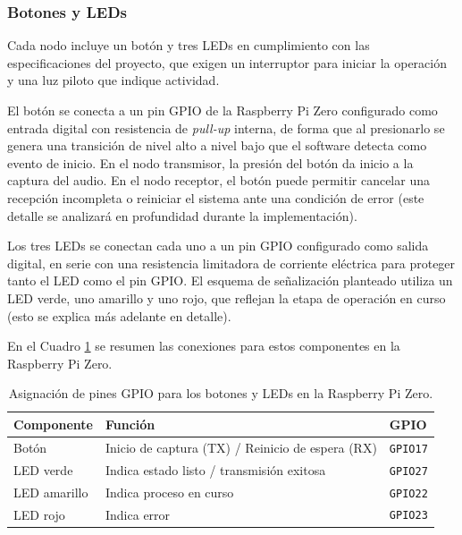 \subsubsection{Botones y LEDs}

Cada nodo incluye un botón y tres LEDs en cumplimiento con las especificaciones del proyecto, que exigen un interruptor para iniciar la operación y una luz piloto que indique actividad.

El botón se conecta a un pin GPIO de la Raspberry Pi Zero configurado como entrada digital con resistencia de \textit{pull-up} interna, de forma que al presionarlo se genera una transición de nivel alto a nivel bajo que el software detecta como evento de inicio.
En el nodo transmisor, la presión del botón da inicio a la captura del audio.
En el nodo receptor, el botón puede permitir cancelar una recepción incompleta o reiniciar el sistema ante una condición de error (este detalle se analizará en profundidad durante la implementación).

Los tres LEDs se conectan cada uno a un pin GPIO configurado como salida digital, en serie con una resistencia limitadora de corriente eléctrica para proteger tanto el LED como el pin GPIO.
El esquema de señalización planteado utiliza un LED verde, uno amarillo y uno rojo, que reflejan la etapa de operación en curso (esto se explica más adelante en detalle).

En el Cuadro \ref{tab:gpio_botones_leds} se resumen las conexiones para estos componentes en la Raspberry Pi Zero.

\begin{table}[htb]
    \centering
    \caption{Asignación de pines GPIO para los botones y LEDs en la Raspberry Pi Zero.}
    \label{tab:gpio_botones_leds}
    \begin{tabular}{@{}lp{3.5cm}l@{}}
        \toprule
        Componente   & Función & GPIO \\
        \midrule
        Botón        & Inicio de captura (TX) / Reinicio de espera (RX) & \texttt{GPIO17} \\
        LED verde    & Indica estado listo / transmisión exitosa        & \texttt{GPIO27} \\
        LED amarillo & Indica proceso en curso                          & \texttt{GPIO22} \\
        LED rojo     & Indica error                                     & \texttt{GPIO23} \\
        \bottomrule
    \end{tabular}
\end{table}

